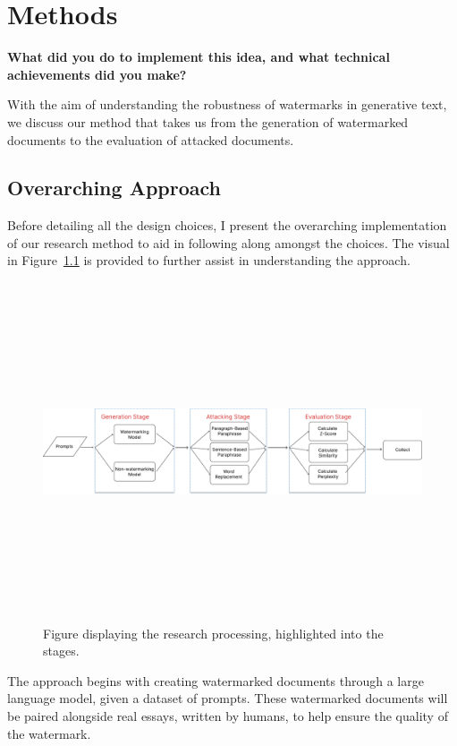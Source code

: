\documentclass{l4proj}
\theoremstyle{definition}
\begin{document}
    
\chapter{Methods}
\textbf{What did you do to implement this idea, and what technical achievements did you make?}

With the aim of understanding the robustness of watermarks in generative text, we discuss our method that takes us from the generation of watermarked documents to the evaluation of attacked documents.

\section{Overarching Approach}
    Before detailing all the design choices, I present the overarching implementation of our research method to aid in following along amongst the choices. The visual in Figure~\ref{fig:method-flow-chart} is provided to further assist in understanding the approach.

    \begin{figure}[h]
        \centering
         \includegraphics[height=10cm, width=1\linewidth, keepaspectratio]{images/methods/research-process.pdf}
        \caption{Figure displaying the research processing, highlighted into the stages.}
        \label{fig:method-flow-chart} 
    \end{figure}
    
    The approach begins with creating watermarked documents through a large language model, given a dataset of prompts. These watermarked documents will be paired alongside real essays, written by humans, to help ensure the quality of the watermark.
\end{document}
